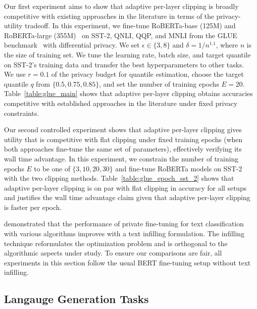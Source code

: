 Our first experiment aims to show that adaptive per-layer clipping is broadly competitive with existing approaches in the literature in terms of the privacy-utility tradeoff. 
In this experiment, we fine-tune RoBERTa-base (125M) and RoBERTa-large (355M)~\citep{liu2019roberta} on SST-2, QNLI, QQP, and MNLI from the GLUE benchmark~\citep{wang2018glue} with differential privacy. 
We set $\epsilon\in \{3,8\}$ and $\delta=1/n^{1.1}$, where $n$ is the size of training set.
We tune the learning rate, batch size, and target quantile on SST-2's training data and transfer the best hyperparameters to other tasks. 
We use $r=0.1$ of the privacy budget for quantile estimation, choose the target quantile $q$ from $\{0.5, 0.75, 0.85\}$, and set the number of training epochs $E=20$.  %
Table~\ref{table:glue_main} shows that adaptive per-layer clipping obtains accuracies competitive with established approaches in the literature under fixed privacy constraints.

Our second controlled experiment shows that adaptive per-layer clipping gives utility that is competitive with flat clipping under fixed training epochs (when both approaches fine-tune the same set of parameters), effectively verifying its wall time advantage. 
In this experiment, we constrain the number of training epochs $E$ to be one of $\{3, 10, 20, 30\}$ and fine-tune RoBERTa models on SST-2 with the two clipping methods.
Table~\ref{table:glue_epoch_sst_2} shows that adaptive per-layer clipping is 
on par with flat clipping in accuracy for all setups and justifies the wall time advantage claim given that adaptive per-layer clipping is faster per epoch. 

\cite{li2022large} demonstrated that the performance of private fine-tuning for text classification with various algorithms improves with a text infilling formulation. 
The infilling technique reformulates the optimization problem and is orthogonal to the algorithmic aspects under study. 
To ensure our comparisons are fair, all experiments in this section follow the usual BERT fine-tuning setup without text infilling. 



\subsection{Langauge Generation Tasks} \label{subsec:gpt}


